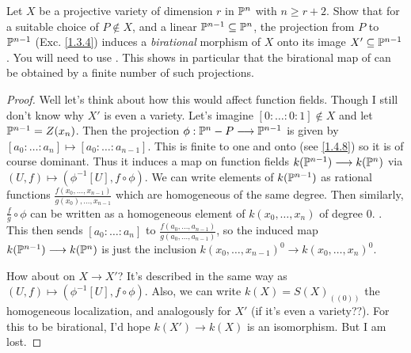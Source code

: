 \label{1.4.9}

Let $X$ be a projective variety of dimension $r$ in $\P^n$ with $n \geq r + 2$. Show that for a suitable choice of $P \notin X$, and a linear $\P^{n - 1} \subseteq \P^n$, the projection from $P$ to $\P^{n - 1}$ (Exc. \ref{1.3.4}) induces a \emph{birational} morphism of $X$ onto its image $X' \subseteq \P^{n - 1}$. You will need to use \cite[I.4.6A, I.4.7A, I.4.8A]{hartshorne}. This shows in particular that the birational map of \cite[I.4.9]{hartshorne} can be obtained by a finite number of such projections.

\begin{proof}
    Well let's think about how this would affect function fields. Though I still don't know why $X'$ is even a variety. Let's imagine $[0 : \dots : 0 : 1] \notin X$ and let $\P^{n-1} = Z(x_n)$. Then the projection $\phi: \P^n - P \longrightarrow \P^{n - 1}$ is given by $[a_0 : \dots : a_n] \mapsto [a_0 : \dots : a_{n - 1}]$. This is finite to one and onto (see \ref{1.4.8}) so it is of course dominant. Thus it induces a map on function fields $k(\P^{n - 1}) \longrightarrow k(\P^n)$ via $(U, f) \mapsto (\phi^{-1}[U], f \circ \phi)$. We can write elements of $k(\P^{n - 1})$ as rational functions $\frac{f(x_0, \dots, x_{n-1})}{g(x_0), \dots, x_{n-1}}$ which are homogeneous of the same degree. Then similarly, $\frac{f}{g} \circ \phi$ can be written as a homogeneous element of $k(x_0, \dots, x_n)$ of degree $0$. . This then sends $[a_0 : \dots : a_n]$ to $\frac{f(a_0, \dots, a_{n-1})}{g(a_0, \dots, a_{n-1})}$, so the induced map $k(\P^{n - 1}) \longrightarrow k(\P^n)$ is just the inclusion $k(x_0, \dots, x_{n-1})^0 \longrightarrow k(x_0, \dots, x_n)^0$.

    How about on $X \longrightarrow X'$? It's described in the same way as $(U, f) \mapsto (\phi^{-1}[U], f \circ \phi)$. Also, we can write $k(X) = S(X)_{((0))}$ the homogeneous localization, and analogously for $X'$ (if it's even a variety??). For this to be birational, I'd hope $k(X') \longrightarrow k(X)$ is an isomorphism. But I am lost.
\end{proof}
